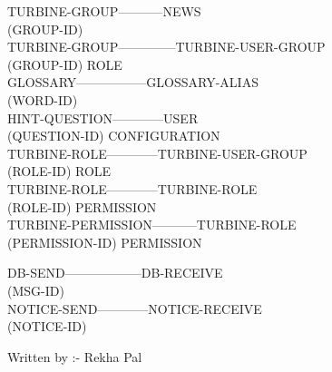 \documentclass{article}
\begin{document}
\begin{enumerate}
TURBINE-GROUP-----------NEWS\\
       (GROUP-ID) \\

TURBINE-GROUP--------------TURBINE-USER-GROUP \\
       (GROUP-ID)                   ROLE\\

GLOSSARY-----------------GLOSSARY-ALIAS \\
        (WORD-ID)\\

HINT-QUESTION------------USER\\ 
       (QUESTION-ID)       CONFIGURATION\\

TURBINE-ROLE------------TURBINE-USER-GROUP \\
       (ROLE-ID)                    ROLE\\

TURBINE-ROLE------------TURBINE-ROLE\\ 
     (ROLE-ID)                   PERMISSION\\

TURBINE-PERMISSION-----------TURBINE-ROLE\\
       (PERMISSION-ID)      PERMISSION

DB-SEND------------------DB-RECEIVE \\
      (MSG-ID) \\

NOTICE-SEND------------NOTICE-RECEIVE \\
          (NOTICE-ID)\\
\end{enumerate}
Written by :- Rekha Pal
\end{document}
